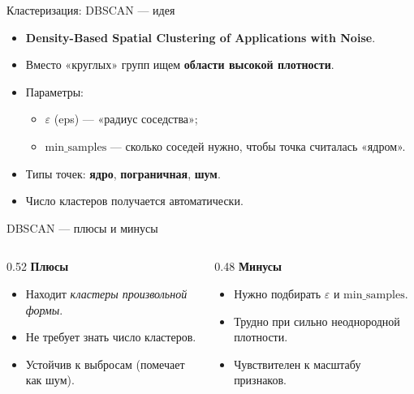 \documentclass[aspectratio=169]{beamer}
\newcommand{\term}[1]{\textbf{#1}}
\begin{document}
\begin{frame}{Кластеризация: DBSCAN — идея}
	\begin{itemize}
		\item \term{Density-Based Spatial Clustering of Applications with Noise}.
		\item Вместо «круглых» групп ищем \term{области высокой плотности}.
		\item Параметры:
		      \begin{itemize}
			      \item \(\varepsilon\) (eps) — «радиус соседства»;
			      \item \(\text{min\_samples}\) — сколько соседей нужно, чтобы точка считалась «ядром».
		      \end{itemize}
		\item Типы точек: \term{ядро}, \term{пограничная}, \term{шум}.
		\item Число кластеров получается автоматически.
	\end{itemize}
\end{frame}

\begin{frame}{DBSCAN — плюсы и минусы}
	\begin{columns}[T]
		\begin{column}{0.52\textwidth}
			\textbf{Плюсы}
			\begin{itemize}
				\item Находит \emph{кластеры произвольной формы}.
				\item Не требует знать число кластеров.
				\item Устойчив к выбросам (помечает как шум).
			\end{itemize}
		\end{column}
		\begin{column}{0.48\textwidth}
			\textbf{Минусы}
			\begin{itemize}
				\item Нужно подбирать \(\varepsilon\) и \(\text{min\_samples}\).
				\item Трудно при сильно неоднородной плотности.
				\item Чувствителен к масштабу признаков.
			\end{itemize}
		\end{column}
	\end{columns}
\end{frame}
\end{document}
